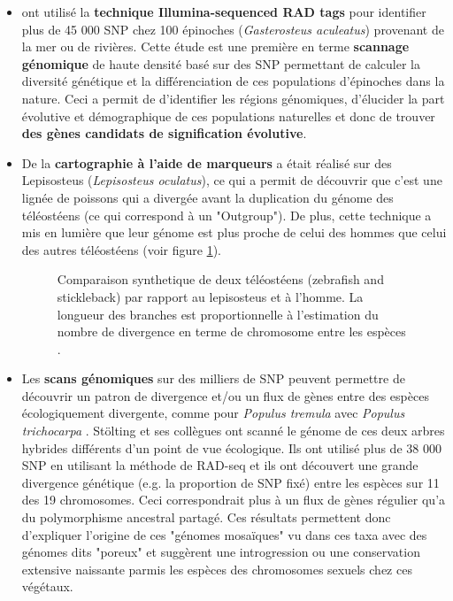 \documentclass[a4paper]{article}
\begin{document}
\begin{itemize}
\item \cite{hohenlohe2010population} ont utilisé la \textbf{technique Illumina-sequenced RAD tags} pour identifier plus de 45 000 SNP chez 100 épinoches (\textit{Gasterosteus aculeatus}) provenant de la mer ou de rivières. Cette étude est une première en terme \textbf{scannage génomique} de haute densité basé sur des SNP permettant de calculer la diversité génétique et la différenciation de ces populations d'épinoches dans la nature. Ceci a permit de d'identifier les régions génomiques, d'élucider la part évolutive et démographique de ces populations naturelles et donc de trouver \textbf{des gènes candidats de signification évolutive}. 

\item De la \textbf{cartographie à l'aide de marqueurs} a était réalisé sur des Lepisosteus (\textit{Lepisosteus oculatus})\cite{Amores:2011aa}, ce qui a permit de découvrir que c'est une lignée de poissons qui a divergée avant la duplication du génome des téléostéens (ce qui correspond à un "Outgroup"). De plus, cette technique a mis en lumière que leur génome est plus proche de celui des hommes que celui des autres téléostéens (voir figure \ref{2}).

\begin{figure}[!h]
\caption{Comparaison synthetique de deux téléostéens (zebrafish and stickleback) par rapport au lepisosteus et à l'homme. La longueur des branches est proportionnelle à l'estimation du nombre de divergence en terme de chromosome entre les espèces \cite{Amores:2011aa}\label{2}.}
\end{figure}


\item Les \textbf{scans génomiques} sur des milliers de SNP peuvent permettre de découvrir un patron de divergence et/ou un flux de gènes entre des espèces écologiquement divergente, comme pour \textit{Populus tremula} avec \textit{Populus trichocarpa} \cite{Stolting:2013aa}. Stölting et ses collègues ont scanné le génome de ces deux arbres hybrides différents d'un point de vue écologique. Ils ont utilisé plus de 38 000 SNP en utilisant la méthode de RAD-seq et ils ont découvert une grande divergence génétique (e.g. la proportion de SNP fixé) entre les espèces sur 11 des 19 chromosomes. Ceci correspondrait plus à un flux de gènes régulier qu'a du polymorphisme ancestral partagé. Ces résultats permettent donc d'expliquer l'origine de ces "génomes mosaïques" \cite{Stolting:2013aa} vu dans ces taxa avec des génomes dits "poreux" \cite{Stolting:2013aa} et suggèrent une introgression ou une conservation extensive naissante parmis les espèces des chromosomes sexuels chez ces végétaux. 


\end{itemize}
\end{document}
